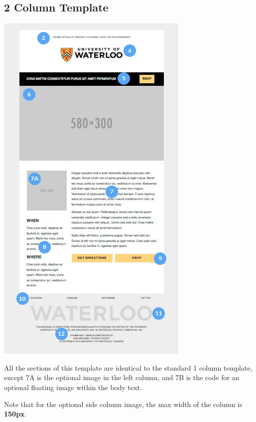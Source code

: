 \documentclass[a4paper,11pt]{article}
\begin{document}
	\subsection{2 Column Template}
	\begin{center}
	\includegraphics[scale=0.58]{images/2-col-template}
	\end{center}
	All the sections of this template are identical to the standard 1 column template, except 7A is the optional image in the left column, and 7B is the code for an optional floating image within the body text.\par
	Note that for the optional side column image, the max width of the column is \textbf{150px}.
	
\end{document}
